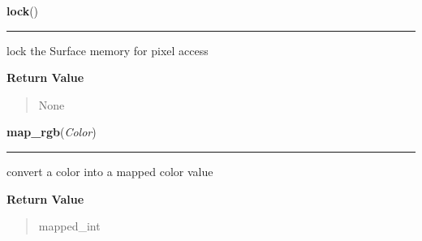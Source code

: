     \label{pygame:Surface:lock}

    \vspace{0.5ex}

\hspace{.8\funcindent}\begin{boxedminipage}{\funcwidth}

    \raggedright \textbf{lock}()

    \vspace{-1.5ex}

    \rule{\textwidth}{0.5\fboxrule}
\setlength{\parskip}{2ex}
    lock the Surface memory for pixel access

\setlength{\parskip}{1ex}
      \textbf{Return Value}
    \vspace{-1ex}

      \begin{quote}
      None

      \end{quote}

    \end{boxedminipage}

    \label{pygame:Surface:map_rgb}

    \vspace{0.5ex}

\hspace{.8\funcindent}\begin{boxedminipage}{\funcwidth}

    \raggedright \textbf{map\_rgb}(\textit{Color})

    \vspace{-1.5ex}

    \rule{\textwidth}{0.5\fboxrule}
\setlength{\parskip}{2ex}
    convert a color into a mapped color value

\setlength{\parskip}{1ex}
      \textbf{Return Value}
    \vspace{-1ex}

      \begin{quote}
      mapped\_int

      \end{quote}

    \end{boxedminipage}

    \label{pygame:Surface:mustlock}

    \vspace{0.5ex}

